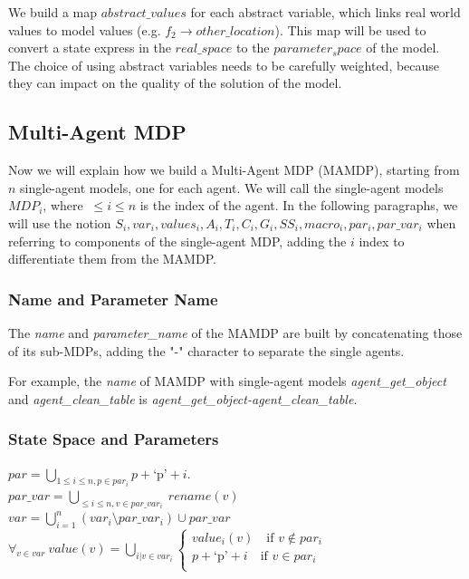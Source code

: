 We build a map $abstract\_values$ for each abstract variable, which links real world values to model values (e.g. $f_2 \rightarrow other\_location$). This map will be used to convert a state express in the $real\_space$ to the $parameter_space$ of the model. The choice of using abstract variables needs to be carefully weighted, because they can impact on the quality of the solution of the model.

\subsection{Multi-Agent MDP}
Now we will explain how we build a Multi-Agent MDP (MAMDP), starting from $n$ single-agent models, one for each agent. We will call the single-agent models $MDP_i$, where $\ \leq i \leq n $ is the index of the agent. In the following paragraphs, we will use the notion $S_i, var_i, values_i, A_i, T_i, C_i, G_i, SS_i, macro_i, par_i, par\_var_i$ when referring to components of the single-agent MDP, adding the $i$ index to differentiate them from the MAMDP. 
 
\subsubsection{Name and Parameter Name}
The \textit{name} and \textit{parameter\_name} of the MAMDP are built by concatenating those of its sub-MDPs, adding the "-" character to separate the single agents.

For example, the \textit{name} of MAMDP with single-agent models \textit{agent\_get\_object} and  \textit{agent\_clean\_table} is \textit{agent\_get\_object-agent\_clean\_table}.

\subsubsection{State Space and Parameters}
$par=\bigcup_{1 \leq i \leq n, p \in par_i} p+\text{`p'}+i $. \\
$par\_var=\bigcup_{\leq i \leq n, v \in par\_var_i} \> rename(v)$ \\
$var=\bigcup_{i=1}^{n}(var_i \setminus par\_var_i) \cup par\_var$ \\
$\forall_{v \in var}\> value(v)=\bigcup_{i| v \in var_i} 
\begin{cases}
	 value_i(v) \quad \text{if } v \not \in par_i \\
	 p+\text{`p'}+i \quad \text{if } v \in par_i \\
\end{cases}$ \\ 

